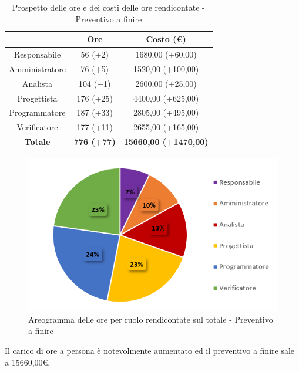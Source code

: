 \begin{table}[H]
  \centering
  \renewcommand{\arraystretch}{1.8}
  \begin{tabular}{c|c|c}
    \rowcolor[HTML]{125E28}
    \multicolumn{1}{c}{\color[HTML]{FFFFFF}\textbf{Ruolo}}
                    & \multicolumn{1}{c}{\color[HTML]{FFFFFF}\textbf{Ore}}
                    & \multicolumn{1}{c}{\color[HTML]{FFFFFF}\textbf{Costo (€)}}                                \\
    \hline
    Responsabile    & 56 (+2)                                                    & 1680,00  (+60,00)            \\
    Amministratore  & 76 (+5)                                                    & 1520,00 (+100,00)            \\
    Analista        & 104 (+1)                                                   & 2600,00 (+25,00)             \\
    Progettista     & 176 (+25)                                                  & 4400,00 (+625,00)            \\
    Programmatore   & 187 (+33)                                                  & 2805,00 (+495,00)            \\
    Verificatore    & 177 (+11)                                                  & 2655,00 (+165,00)            \\
    \textbf{Totale} & \textbf{776 (+77)}                                         & \textbf{15660,00 (+1470,00)} \\
  \end{tabular}
  \caption{Prospetto delle ore e dei costi delle ore rendicontate - Preventivo a finire}
\end{table}

\begin{figure}[H]
  \centering
  \includegraphics[scale=0.8]{immagini/ore_ruolo_preventivo_finire_PB.png}
  \caption{Areogramma delle ore per ruolo rendicontate sul totale - Preventivo a finire}
\end{figure}

Il carico di ore a persona è notevolmente aumentato ed il preventivo a finire sale a 15660,00€.



